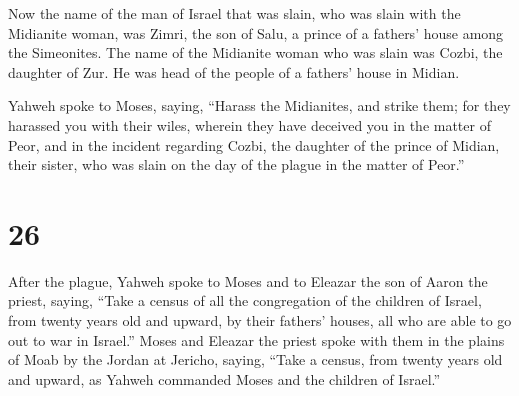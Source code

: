  Now the name of the man of Israel that was slain, who was
slain with the Midianite woman, was Zimri, the son of Salu, a prince of
a fathers' house among the Simeonites.  The name of the
Midianite woman who was slain was Cozbi, the daughter of Zur. He was
head of the people of a fathers' house in Midian.

 Yahweh spoke to Moses, saying,  ``Harass the
Midianites, and strike them;  for they harassed you with
their wiles, wherein they have deceived you in the matter of Peor, and
in the incident regarding Cozbi, the daughter of the prince of Midian,
their sister, who was slain on the day of the plague in the matter of
Peor.''

\hypertarget{section-25}{%
\section{26}\label{section-25}}

 After the plague, Yahweh spoke to Moses and to Eleazar the
son of Aaron the priest, saying,  ``Take a census of all the
congregation of the children of Israel, from twenty years old and
upward, by their fathers' houses, all who are able to go out to war in
Israel.''  Moses and Eleazar the priest spoke with them in
the plains of Moab by the Jordan at Jericho, saying,  ``Take
a census, from twenty years old and upward, as Yahweh commanded Moses
and the children of Israel.''

